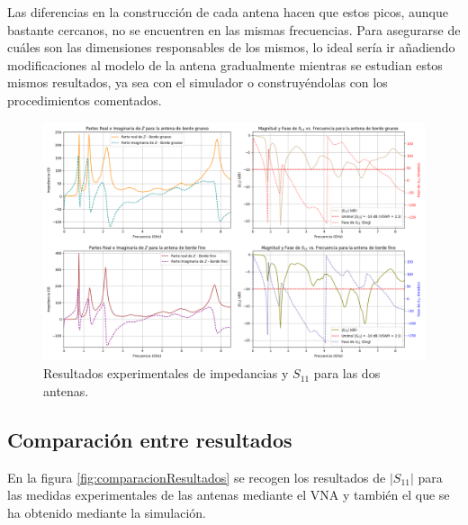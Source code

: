 \documentclass[11pt,a4paper,twoside,pdf]{article}
\numberwithin{equation}{section}
\begin{document}
Las diferencias en la construcción de cada antena hacen que estos picos, aunque bastante cercanos, no se encuentren en las mismas frecuencias. Para asegurarse de cuáles son las dimensiones responsables de los mismos, lo ideal sería ir añadiendo modificaciones al modelo de la antena gradualmente mientras se estudian estos mismos resultados, ya sea con el simulador o construyéndolas con los procedimientos comentados.
\begin{figure}[!h]
    \centering
    \includegraphics[width=\linewidth]{img/medidasExp/S11Z.png}
    \vspace{-0.5cm}
    \caption{Resultados experimentales de impedancias y $S_{11}$ para las dos antenas.}
    \label{fig:S11ZExp}
\end{figure}


\subsection{Comparación entre resultados}

En la figura \ref{fig:comparacionResultados} se recogen los resultados de $|S_{11}|$ para las medidas experimentales de las antenas mediante el VNA y también el que se ha obtenido mediante la simulación.\\
\end{document}
